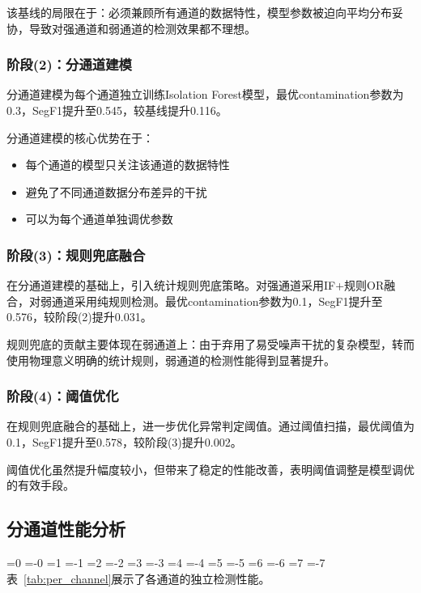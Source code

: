 \documentclass[12pt, a4paper]{article}
\newcommand{\zihao}[1]{%
    \ifnum#1=0 {\fontsize{42pt}{50pt}\selectfont}%
    \else\ifnum#1=-0 {\fontsize{36pt}{44pt}\selectfont}%
    \else\ifnum#1=1 {\fontsize{26pt}{32pt}\selectfont}%
    \else\ifnum#1=-1 {\fontsize{24pt}{28pt}\selectfont}%
    \else\ifnum#1=2 {\fontsize{22pt}{26pt}\selectfont}%
    \else\ifnum#1=-2 {\fontsize{18pt}{22pt}\selectfont}%
    \else\ifnum#1=3 {\fontsize{16pt}{20pt}\selectfont}%
    \else\ifnum#1=-3 {\fontsize{15pt}{18pt}\selectfont}%
    \else\ifnum#1=4 {\fontsize{14pt}{17pt}\selectfont}%
    \else\ifnum#1=-4 {\fontsize{12pt}{15pt}\selectfont}%
    \else\ifnum#1=5 {\fontsize{10.5pt}{13pt}\selectfont}%
    \else\ifnum#1=-5 {\fontsize{9pt}{11pt}\selectfont}%
    \else\ifnum#1=6 {\fontsize{7.5pt}{9pt}\selectfont}%
    \else\ifnum#1=-6 {\fontsize{6.5pt}{8pt}\selectfont}%
    \else\ifnum#1=7 {\fontsize{5.5pt}{7pt}\selectfont}%
    \else\ifnum#1=-7 {\fontsize{5pt}{6pt}\selectfont}%
    \fi\fi\fi\fi\fi\fi\fi\fi\fi\fi\fi\fi\fi\fi\fi\fi
}
\newcommand{\songti}{\CJKfontspec{SimSun}}
\begin{document}
该基线的局限在于：必须兼顾所有通道的数据特性，模型参数被迫向平均分布妥协，导致对强通道和弱通道的检测效果都不理想。

\subsubsection{阶段(2)：分通道建模}

分通道建模为每个通道独立训练Isolation Forest模型，最优contamination参数为0.3，SegF1提升至0.545，较基线提升0.116。

分通道建模的核心优势在于：
\begin{itemize}
    \item 每个通道的模型只关注该通道的数据特性
    \item 避免了不同通道数据分布差异的干扰
    \item 可以为每个通道单独调优参数
\end{itemize}

\subsubsection{阶段(3)：规则兜底融合}

在分通道建模的基础上，引入统计规则兜底策略。对强通道采用IF+规则OR融合，对弱通道采用纯规则检测。最优contamination参数为0.1，SegF1提升至0.576，较阶段(2)提升0.031。

规则兜底的贡献主要体现在弱通道上：由于弃用了易受噪声干扰的复杂模型，转而使用物理意义明确的统计规则，弱通道的检测性能得到显著提升。

\subsubsection{阶段(4)：阈值优化}

在规则兜底融合的基础上，进一步优化异常判定阈值。通过阈值扫描，最优阈值为0.1，SegF1提升至0.578，较阶段(3)提升0.002。

阈值优化虽然提升幅度较小，但带来了稳定的性能改善，表明阈值调整是模型调优的有效手段。

\subsection{分通道性能分析}

\zihao{5}\songti
表~\ref{tab:per_channel}展示了各通道的独立检测性能。
\end{document}
